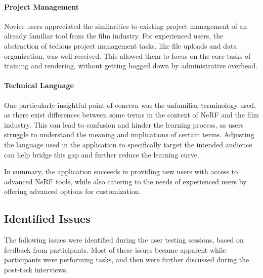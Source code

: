 
\paragraph{Project Management}
Novice users appreciated the similarities to existing project management of an already familiar tool from the film industry. 
\cite{P5}
For experienced users, the abstraction of tedious project management tasks, like file uploads and data organization, was well received.
\cite{P1}
This allowed them to focus on the core tasks of training and rendering, without getting bogged down by administrative overhead.


\paragraph{Technical Language}
One particularly insightful point of concern was the unfamiliar terminology used, as there exist differences between some terms in the context of NeRF and the film industry. 
\cite{P5}
This can lead to confusion and hinder the learning process, as users struggle to understand the meaning and implications of certain terms.
Adjusting the language used in the application to specifically target the intended audience can help bridge this gap and further reduce the learning curve.


In summary, the application succeeds in providing new users with access to advanced NeRF tools, while also catering to the needs of experienced users by offering advanced options for customization.

\subsection*{Identified Issues}
\label{sec:results:issues}

The following issues were identified during the user testing sessions, based on feedback from participants. 
Most of these issues became apparent while participants were performing tasks, and then were further discussed during the post-task interviews.

